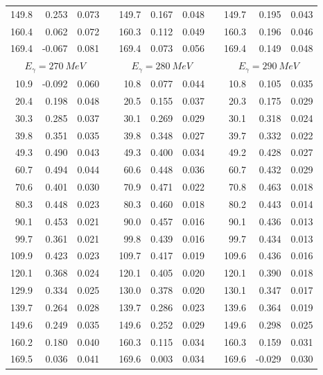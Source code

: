 \begin{table}[htbp]
\begin{center}
\begin{tabular}{|r|r|c|l|r|r|c|l|r|r|c|}
149.8 & 0.253 & 0.073 & & 149.7 & 0.167 & 0.048 & & 149.7 & 0.195 & 0.043 \\ 
160.4 & 0.062 & 0.072 & & 160.3 & 0.112 & 0.049 & & 160.3 & 0.196 & 0.046 \\ 
169.4 & -0.067 & 0.081 & & 169.4 & 0.073 & 0.056 & & 169.4 & 0.149 & 0.048 \\ 
\hline 
\hline 
\multicolumn{3}{|c|}{ $E_{\gamma}=270~MeV$} & & 
\multicolumn{3}{c|}{ $E_{\gamma}=280~MeV$} & & 
\multicolumn{3}{c|}{ $E_{\gamma}=290~MeV$} \\ 
\cline{1-3} 
\cline{5-7} 
\cline{9-11} 
 10.9 & -0.092 & 0.060 & &  10.8 & 0.077 & 0.044 & &  10.8 & 0.105 & 0.035 \\ 
 20.4 & 0.198 & 0.048 & &  20.5 & 0.155 & 0.037 & &  20.3 & 0.175 & 0.029 \\ 
 30.3 & 0.285 & 0.037 & &  30.1 & 0.269 & 0.029 & &  30.1 & 0.318 & 0.024 \\ 
 39.8 & 0.351 & 0.035 & &  39.8 & 0.348 & 0.027 & &  39.7 & 0.332 & 0.022 \\ 
 49.3 & 0.490 & 0.043 & &  49.3 & 0.400 & 0.034 & &  49.2 & 0.428 & 0.027 \\ 
 60.7 & 0.494 & 0.044 & &  60.6 & 0.448 & 0.036 & &  60.7 & 0.432 & 0.029 \\ 
 70.6 & 0.401 & 0.030 & &  70.9 & 0.471 & 0.022 & &  70.8 & 0.463 & 0.018 \\ 
 80.3 & 0.448 & 0.023 & &  80.3 & 0.460 & 0.018 & &  80.2 & 0.443 & 0.014 \\ 
 90.1 & 0.453 & 0.021 & &  90.0 & 0.457 & 0.016 & &  90.1 & 0.436 & 0.013 \\ 
 99.7 & 0.361 & 0.021 & &  99.8 & 0.439 & 0.016 & &  99.7 & 0.434 & 0.013 \\ 
109.9 & 0.423 & 0.023 & & 109.7 & 0.417 & 0.019 & & 109.6 & 0.436 & 0.016 \\ 
120.1 & 0.368 & 0.024 & & 120.1 & 0.405 & 0.020 & & 120.1 & 0.390 & 0.018 \\ 
129.9 & 0.334 & 0.025 & & 130.0 & 0.378 & 0.020 & & 130.1 & 0.347 & 0.017 \\ 
139.7 & 0.264 & 0.028 & & 139.7 & 0.286 & 0.023 & & 139.6 & 0.364 & 0.019 \\ 
149.6 & 0.249 & 0.035 & & 149.6 & 0.252 & 0.029 & & 149.6 & 0.298 & 0.025 \\ 
160.2 & 0.180 & 0.040 & & 160.3 & 0.115 & 0.034 & & 160.3 & 0.159 & 0.031 \\ 
169.5 & 0.036 & 0.041 & & 169.6 & 0.003 & 0.034 & & 169.6 & -0.029 & 0.030 \\ 
\cline{1-3} 
\cline{5-7} 
\cline{9-11} 
\end{tabular} 

\end{center} 
\end{table} 
